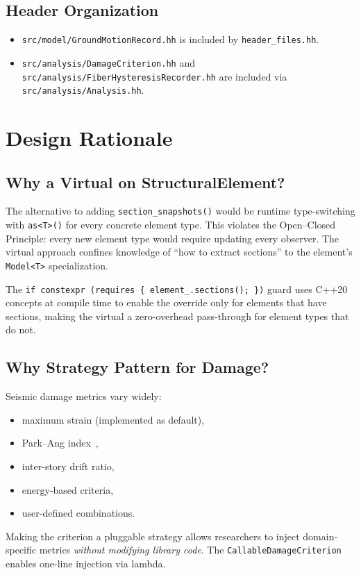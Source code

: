\subsection{Header Organization}

\begin{itemize}
  \item \texttt{src/model/GroundMotionRecord.hh} is included
        by \texttt{header\_files.hh}.
  \item \texttt{src/analysis/DamageCriterion.hh} and
        \texttt{src/analysis/FiberHysteresisRecorder.hh}
        are included via \texttt{src/analysis/Analysis.hh}.
\end{itemize}


\section{Design Rationale}
\label{sec:seismic-rationale}

\subsection{Why a Virtual on StructuralElement?}

The alternative to adding \texttt{section\_snapshots()} would be
runtime type-switching with \texttt{as<T>()} for every concrete
element type.  This violates the Open--Closed Principle: every new
element type would require updating every observer.  The virtual
approach confines knowledge of ``how to extract sections'' to
the element's \texttt{Model<T>} specialization.

The \texttt{if constexpr (requires \{ element\_.sections(); \})}
guard uses C++20 concepts at compile time to enable the override
only for elements that have sections, making the virtual a
zero-overhead pass-through for element types that do not.

\subsection{Why Strategy Pattern for Damage?}

Seismic damage metrics vary widely:
\begin{itemize}
  \item maximum strain (implemented as default),
  \item Park--Ang index~\cite{parkang1985},
  \item inter-story drift ratio,
  \item energy-based criteria,
  \item user-defined combinations.
\end{itemize}
Making the criterion a pluggable strategy allows researchers to
inject domain-specific metrics \emph{without modifying library code}.
The \texttt{CallableDamageCriterion} enables one-line injection
via lambda.

